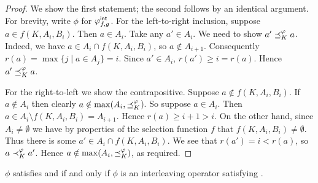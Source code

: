 \begin{proof}
    We show the first statement; the second follows by an identical argument.
    For brevity, write $\phi$ for ${\varphi_{f, g}^\mathsf{int}}$.
    For the left-to-right inclusion, suppose $a \in f(K, A_i, B_i)$. Then $a
    \in A_i$. Take any $a' \in A_i$. We need to show $a' \preceq_K^\varphi a$.
    Indeed, we have $a \in A_i \cap f(K, A_i, B_i)$, so $a \notin A_{i + 1}$.
    Consequently $r(a) = \max\{j \mid a \in A_j\} = i$. Since $a' \in A_i$,
    $r(a') \ge i = r(a)$. Hence $a' \preceq_K^\varphi a$.

    For the right-to-left we show the contrapositive. Suppose $a \notin  f(K,
    A_i, B_i)$. If $a \notin A_i$ then clearly $a \notin \max(A_i,
    {\preceq_K^\varphi}$). So suppose $a \in A_i$. Then $a \in A_i \setminus f(K,
    A_i, B_i) = A_{i + 1}$. Hence $r(a) \ge i + 1 > i$. On the other hand,
    since $A_i \ne \emptyset$ we have by properties of the selection function
    $f$ that $f(K, A_i, B_i) \ne \emptyset$. Thus there is some $a' \in A_i
    \cap f(K, A_i, B_i)$. We see that $r(a') = i < r(a)$, so $a \prec_K^\varphi
    a'$.  Hence $a \notin \max(A_i, {\preceq_K^\varphi})$, as required.
\end{proof}

\begin{proposition}
    \label{tourn_result_rank_removal_smi}
    $\phi$ satisfies \chaindef{} and \rankremoval{} if and
    only if $\phi$ is an interleaving operator satisfying \smi{}.
\end{proposition}

